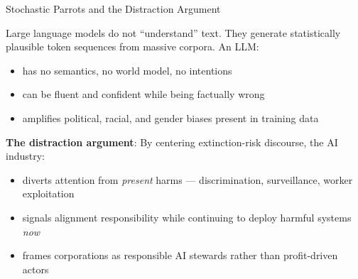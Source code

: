 \documentclass[aspectratio=169,11pt]{beamer}
\begin{document}
\begin{frame}[shrink=18]{Stochastic Parrots and the Distraction Argument}
\begin{objectionbox}
Large language models do not ``understand'' text. They generate statistically plausible token sequences from massive corpora. An LLM:
\begin{itemize}
    \item has no semantics, no world model, no intentions
    \item can be fluent and confident while being factually wrong
    \item amplifies political, racial, and gender biases present in training data
\end{itemize}
\vspace{0.1cm}
\scriptsize\parencite{bender_stochastic_parrots_2021}
\end{objectionbox}

\vspace{0.2cm}
\textbf{The distraction argument}: By centering extinction-risk discourse, the AI industry:
\begin{itemize}
    \item diverts attention from \emph{present} harms --- discrimination, surveillance, worker exploitation
    \item signals alignment responsibility while continuing to deploy harmful systems \emph{now}
    \item frames corporations as responsible AI stewards rather than profit-driven actors
\end{itemize}
\end{frame}
\end{document}
